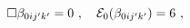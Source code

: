 \begin{equation}\label{decoup2}
\Box \beta_{0ij'k'} = 0 ~,~~~
{\cal E}_0 (\beta_{0ij'k'}) = 6 ~,
\end{equation}

